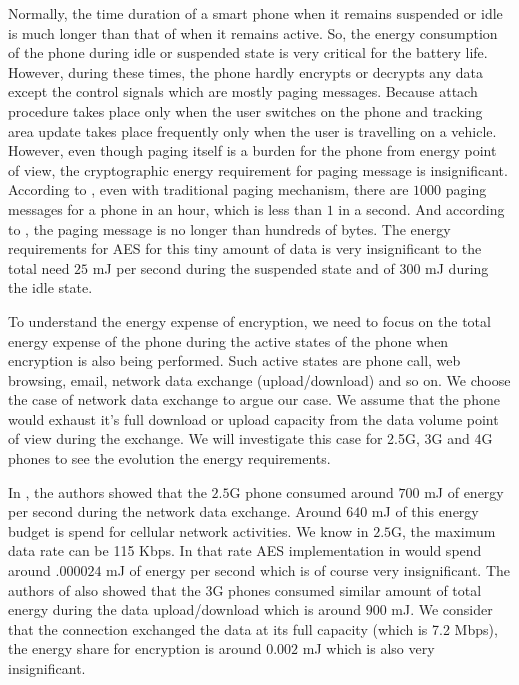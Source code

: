 \documentclass[lnicst,sechang,a4paper]{svmultln}
\begin{document}
Normally, the time duration of a smart phone when it remains suspended or idle is much longer than that of when it remains active. So, the energy consumption of the phone during idle or suspended state is very critical for the battery life. However, during these times, the phone hardly encrypts or decrypts any data except the control signals which are mostly paging messages. Because attach procedure takes place only when the user switches on the phone and tracking area update takes place frequently only when the user is travelling on a vehicle. However, even though paging itself is a burden for the phone from energy point of view, the cryptographic energy requirement for paging message is insignificant. According to \cite{Nokia_2013}, even with traditional paging mechanism, there are $1000$ paging messages for a phone in an hour, which is less than $1$ in a second. And according to \cite{3GPP_TS_36_331}, the paging message is no longer than hundreds of bytes. The energy requirements for AES for this tiny amount of data is very insignificant to the total need $25$ mJ per second during the suspended state and of 300 mJ during the idle state.

To understand the energy expense of encryption, we need to focus on the total energy expense of the phone during the active states of the phone when encryption is also being performed. Such active states are phone call, web browsing, email, network data exchange (upload/download) and so on. We choose the case of network data exchange to argue our case. We assume that the phone would exhaust it's full download or upload capacity from the data volume point of view during the exchange. We will investigate this case for 2.5G, 3G and 4G phones to see the evolution the energy requirements.

In \cite{Usenix_2010}, the authors showed that the $2.5$G phone consumed around $700$ mJ of energy per second during the network data exchange. Around $640$ mJ of this energy budget is spend for cellular network activities. We know in $2.5$G, the maximum data rate can be 115 Kbps. In that rate AES implementation in \cite{Ruhr_2011} would spend around $.000024$ mJ of energy per second which is of course very insignificant. The authors of \cite{Usenix_2010} also showed that the 3G phones consumed similar amount of total energy during the data upload/download which is around $900$ mJ. We consider that the connection exchanged the data at its full capacity (which is 7.2 Mbps), the energy share for encryption is around $0.002$ mJ which is also very insignificant. 
\end{document}
